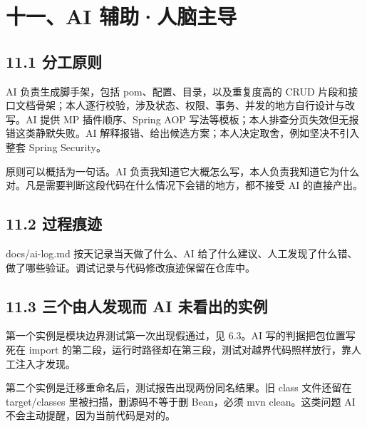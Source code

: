 \documentclass[zihao=-4,UTF8,openany]{ctexart}
\renewcommand{\_}{\textunderscore\allowbreak}
\begin{document}
\section*{\texorpdfstring{\textbf{十一、AI 辅助·人脑主导}}{十一、AI 辅助·人脑主导}}\label{ux4e5dai-ux8f85ux52a9ux4ebaux8111ux4e3bux5bfc}

\subsection*{\texorpdfstring{\textbf{11.1 分工原则}}{11.1 分工原则}}\label{ux5206ux5de5ux539fux5219}

AI 负责生成脚手架，包括 pom、配置、目录，以及重复度高的 CRUD 片段和接口文档骨架；本人逐行校验，涉及状态、权限、事务、并发的地方自行设计与改写。AI 提供 MP 插件顺序、Spring AOP 写法等模板；本人排查分页失效但无报错这类静默失败。AI 解释报错、给出候选方案；本人决定取舍，例如坚决不引入整套 Spring Security。

原则可以概括为一句话。AI 负责我知道它大概怎么写，本人负责我知道它为什么对。凡是需要判断这段代码在什么情况下会错的地方，都不接受 AI 的直接产出。

\subsection*{\texorpdfstring{\textbf{11.2 过程痕迹}}{11.2 过程痕迹}}\label{ux8fc7ux7a0bux75d5ux8ff9}

docs/ai-log.md 按天记录当天做了什么、AI 给了什么建议、人工发现了什么错、做了哪些验证。调试记录与代码修改痕迹保留在仓库中。

\subsection*{\texorpdfstring{\textbf{11.3 三个由人发现而 AI 未看出的实例}}{11.3 三个由人发现而 AI 未看出的实例}}\label{ux4e09ux4e2aux4ebaux8111ux53d1ux73b0-ai-ux6ca1ux770bux51faux7684ux5b9eux4f8b}

第一个实例是模块边界测试第一次出现假通过，见 6.3。AI 写的判据把包位置写死在 import 的第二段，运行时路径却在第三段，测试对越界代码照样放行，靠人工注入才发现。

第二个实例是迁移重命名后，测试报告出现两份同名结果。旧 class 文件还留在 target/classes 里被扫描，删源码不等于删 Bean，必须 mvn clean。这类问题 AI 不会主动提醒，因为当前代码是对的。
\end{document}
